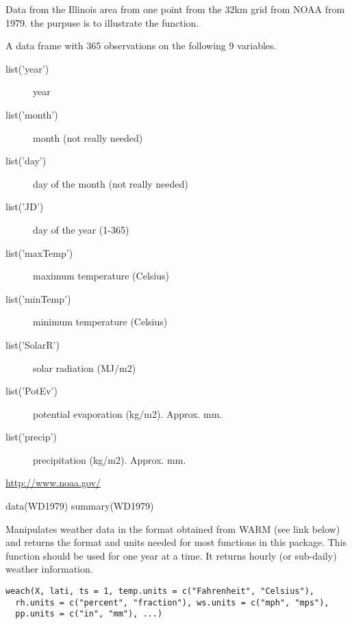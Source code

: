 \documentclass[letterpaper]{book}
\begin{document}
%
\begin{Description}\relax
Data from the Illinois area from one point from the 32km
grid from NOAA from 1979. the purpuse is to illustrate the
 function.
\end{Description}
%
\begin{Format}
A data frame with 365 observations on the following 9 variables.
\begin{description}
 \item[list('year')] year\item[list('month')] month (not really
needed)\item[list('day')] day of the month (not really needed)
\item[list('JD')] day of the year (1-365)\item[list('maxTemp')] maximum
temperature (Celsius)\item[list('minTemp')] minimum temperature
(Celsius)\item[list('SolarR')] solar radiation (MJ/m2)
\item[list('PotEv')] potential evaporation (kg/m2). Approx. mm.
\item[list('precip')] precipitation (kg/m2). Approx. mm.
\end{description}
\end{Format}
%
\begin{Source}\relax
\url{http://www.noaa.gov/}
\end{Source}
%
\begin{Examples}
\begin{ExampleCode}
data(WD1979)
summary(WD1979)
\end{ExampleCode}
\end{Examples}
%
\begin{Description}\relax
Manipulates weather data in the format obtained from WARM
(see link below) and returns the format and units needed
for most functions in this package. This function should be
used for one year at a time.  It returns hourly (or
sub-daily) weather information.
\end{Description}
%
\begin{Usage}
\begin{verbatim}
weach(X, lati, ts = 1, temp.units = c("Fahrenheit", "Celsius"),
  rh.units = c("percent", "fraction"), ws.units = c("mph", "mps"),
  pp.units = c("in", "mm"), ...)
\end{verbatim}
\end{Usage}
\end{document}
